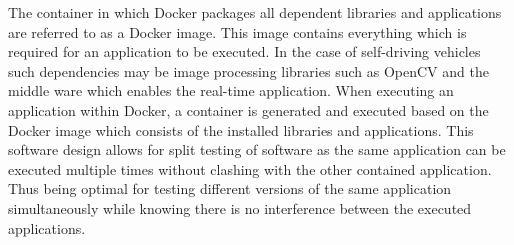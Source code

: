 \begin{figure}[ht]
\end{figure}


The container in which Docker packages all dependent libraries and applications are referred to as a Docker image. This image contains everything which is required for an application to be executed. In the case of self-driving vehicles such dependencies may be image processing libraries such as OpenCV and the middle ware which enables the real-time application. When executing an application within Docker, a container is generated and executed based on the Docker image which consists of the installed libraries and applications. This software design allows for split testing of software as the same application can be executed multiple times without clashing with the other contained application. Thus being optimal for testing different versions of the same application simultaneously while knowing there is no interference between the executed applications.





